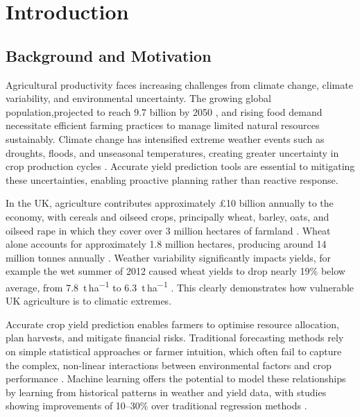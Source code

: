 \documentclass[12pt,a4paper]{report}
\newcommand{\tha}{t\,ha\textsuperscript{$-1$}}
\begin{document}
\tableofcontents
\listoffigures
\listoftables

\chapter{Introduction}

\section{Background and Motivation}

Agricultural productivity faces increasing challenges from climate change, climate variability, and environmental uncertainty. The growing global population,projected to reach 9.7 billion by 2050 \citep{un2019}, and rising food demand necessitate efficient farming practices to manage limited natural resources sustainably. Climate change has intensified extreme weather events such as droughts, floods, and unseasonal temperatures, creating greater uncertainty in crop production cycles \citep{ipcc2021}. Accurate yield prediction tools are essential to mitigating these uncertainties, enabling proactive planning rather than reactive response.

In the UK, agriculture contributes approximately \pounds10 billion annually to the economy, with cereals and oilseed crops, principally wheat, barley, oats, and oilseed rape in which they cover over 3 million hectares of farmland \citep{defra2023}. Wheat alone accounts for approximately 1.8 million hectares, producing around 14 million tonnes annually \citep{ahdb2023a}. Weather variability significantly impacts yields, for example the wet summer of 2012 caused wheat yields to drop nearly 19\% below average, from 7.8~\tha{} to 6.3~\tha{} \citep{defra2012}. This clearly demonstrates how vulnerable UK agriculture is to climatic extremes.

Accurate crop yield prediction enables farmers to optimise resource allocation, plan harvests, and mitigate financial risks. Traditional forecasting methods rely on simple statistical approaches or farmer intuition, which often fail to capture the complex, non-linear interactions between environmental factors and crop performance \citep{vanklompenburg2020}. Machine learning offers the potential to model these relationships by learning from historical patterns in weather and yield data, with studies showing improvements of 10--30\% over traditional regression methods \citep{chlingaryan2018}.
\end{document}
